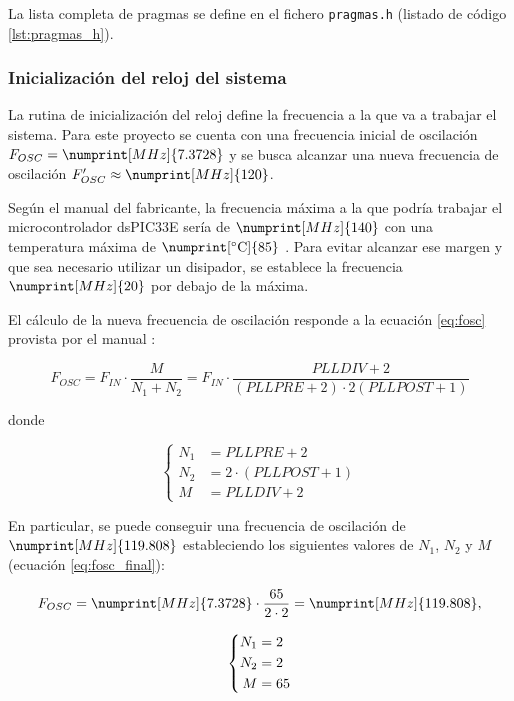 La lista completa de pragmas se define en el fichero \texttt{pragmas.h} (listado de
código \ref{lst:pragmas_h}).

\subsubsection{Inicialización del reloj del sistema}
La rutina de inicialización del reloj define la frecuencia a la que va a trabajar
el sistema. Para este proyecto se cuenta con una frecuencia inicial de oscilación
$F_{OSC} = \numprint[MHz]{7.3728}$ y se busca alcanzar una nueva frecuencia de
oscilación $F_{OSC}' \approx \numprint[MHz]{120}$.

Según el manual del fabricante, la frecuencia máxima a la que podría trabajar
el microcontrolador dsPIC33E sería de $\numprint[MHz]{140}$ con una temperatura
máxima de $\numprint[\celsius]{85}$ \cite{microchipDsPIC33EPIC24EFRM2012}. Para
evitar alcanzar ese margen y que sea necesario utilizar un disipador, se establece 
la frecuencia $\numprint[MHz]{20}$ por debajo de la máxima.

El cálculo de la nueva frecuencia de oscilación responde a la ecuación \ref{eq:fosc}
provista por el manual \cite{microchipDsPIC33EPIC24EFRM2012}:

\begin{equation}\label{eq:fosc}
    F_{OSC} = F_{IN} \cdot \frac{M}{N_1 + N_2} = F_{IN} \cdot \frac{PLLDIV + 2}{\left(PLLPRE + 2\right) \cdot 2\left(PLLPOST + 1\right)}
\end{equation}

donde

\begin{equation*}
    \left\{
        \begin{aligned}
            N_1 &= PLLPRE + 2 \\
            N_2 &= 2 \cdot \left(PLLPOST + 1\right) \\
            M &= PLLDIV + 2
        \end{aligned}
    \right.
\end{equation*}

En particular, se puede conseguir una frecuencia de oscilación de $\numprint[MHz]{119.808}$
estableciendo los siguientes valores de $N_1$, $N_2$ y $M$ (ecuación \ref{eq:fosc_final}):

\begin{equation}\label{eq:fosc_final}
    \begin{gathered}  
        F_{OSC} = \numprint[MHz]{7.3728} \cdot \frac{65}{2 \cdot 2} = \numprint[MHz]{119.808}, \\[2ex]
        \left\{
            \begin{aligned}
                N_1 &= 2 \\
                N_2 &= 2 \\
                M &= 65
            \end{aligned}
        \right.
    \end{gathered}
\end{equation}

